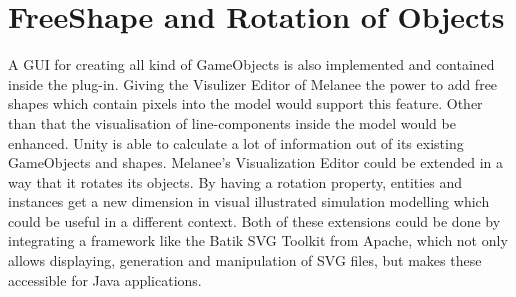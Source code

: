 \section{FreeShape and Rotation of Objects}
A GUI for creating all kind of GameObjects is also implemented and contained inside the plug-in. Giving the Visulizer Editor of Melanee the power to add free shapes which contain pixels into the model would support this feature. Other than that the visualisation of line-components inside the model would be enhanced.
Unity is able to calculate a lot of information out of its existing GameObjects and shapes. Melanee's Visualization Editor could be extended in a way that it rotates its objects. By having a rotation property, entities and instances get a new dimension in visual illustrated simulation modelling which could be useful in a different context.
Both of these extensions could be done by integrating a framework like the Batik SVG Toolkit from Apache, which not only allows displaying, generation and manipulation of SVG files, but makes these accessible for Java applications.